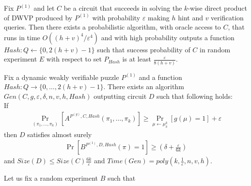 %
%
\begin{lemma}
Fix $P^{(1)}$ and let $C$ be a circuit that succeeds in solving the $k$-wise direct product of DWVP produced by $P^{(1)}$
with probability $\varepsilon$ making $h$ hint and $v$ verification queries.
Then there exists a probabilistic algorithm, with oracle access to $C$, that runs in time $O((h+v)^4/\varepsilon^4)$
and with high probability outputs a function $Hash: Q \leftarrow \{0, 2(h+v)-1\}$ such that success probability of
$C$ in random experiment $E$ with respect to set $P_{Hash}$ is at least $\frac{\varepsilon}{8(h+v)}$.
\end{lemma}
%
%
%
\begin{theorem}
  Fix a dynamic weakly verifiable puzzle $P^{(1)}$ and a function $Hash: Q \rightarrow \{0, \dots, 2(h+v)-1\}$.
  There exists an algorithm $Gen(C, g, \varepsilon, \delta, n, v, h, Hash)$
  outputting circuit $D$ such that following holds: \\
  If
  \begin{align*}
    \underset{(\pi_1, \dots, \pi_k)}{\Pr}[A^{P^{(g)}, C, Hash}(\pi_1, \dots, \pi_k)] \geq \underset{\mu \leftarrow \mu_\delta^k}{\Pr}[g(\mu) = 1] + \varepsilon
  \end{align*}
  then $D$ satisfies almost surely
  \begin{align*}
    \underset{}{\Pr}[B^{P^{(1)},D, Hash}(\pi) = 1] \geq (\delta + \frac{\varepsilon}{6k})
  \end{align*}
  and $Size(D) \leq Size(C)\frac{6k}{\varepsilon}$ and $Time(Gen) = poly(k, \frac{1}{\varepsilon}, n, v, h)$.
\end{theorem}
%
Let us fix a random experiment $B$ such that
